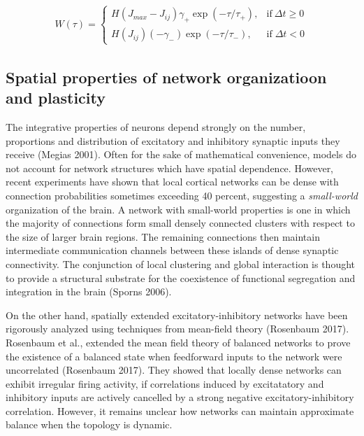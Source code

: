 \documentclass{ucetd}
\begin{document}
\begin{align*}
W(\tau) = \begin{cases}
      H(J_{max}-J_{ij})\gamma_{+}\exp(-\tau/\tau_{+}), & \text{if}\ \Delta t \geq 0 \\
       H(J_{ij})(-\gamma_{-})\exp(-\tau/\tau_{-}), & \text{if} \;\Delta t < 0
    \end{cases}
\end{align*}

\subsection{Spatial properties of network organizatioon and plasticity}

The integrative properties of neurons depend strongly on the number, proportions and distribution of excitatory and inhibitory synaptic inputs they receive (Megias 2001). Often for the sake of mathematical convenience, models do not account for network structures which have spatial dependence. However, recent experiments have shown that local cortical networks can be dense with connection probabilities sometimes exceeding 40 percent, suggesting a \emph{small-world} organization of the brain. A network with small-world properties is one in which the majority of connections form small densely connected clusters with respect to the size of larger brain regions. The remaining connections then maintain intermediate communication channels between these islands of dense synaptic connectivity. The conjunction of local clustering and global interaction is thought to provide a structural substrate for the coexistence of functional segregation and integration in the brain (Sporns 2006). 

On the other hand, spatially extended excitatory-inhibitory networks have been rigorously analyzed using techniques from mean-field theory (Rosenbaum 2017). Rosenbaum et al., extended the mean field theory of balanced networks to prove the existence of a balanced state when feedforward inputs to the network were uncorrelated (Rosenbaum 2017). They showed that locally dense networks can exhibit irregular firing activity, if correlations induced by excitatatory and inhibitory inputs are actively cancelled by a strong negative excitatory-inhibitory correlation. However, it remains unclear how networks can maintain approximate balance when the topology is dynamic.
\end{document}

